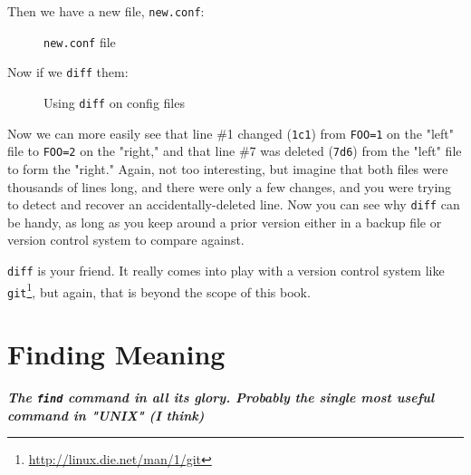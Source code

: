 \documentclass[10pt,american,]{book}
\makeatletter
\newenvironment{Shaded}{\begin{snugshade}}{\end{snugshade}}
\newcommand{\KeywordTok}[1]{\textcolor[rgb]{0.13,0.29,0.53}{\textbf{{#1}}}}
\newcommand{\OtherTok}[1]{\textcolor[rgb]{0.56,0.35,0.01}{{#1}}}
\newcommand{\NormalTok}[1]{{#1}}
\renewcommand{\href}[2]{#2\footnote{\url{#1}}}
\numberwithin{figure}{chapter}
\DeclareRobustCommand{\drcap}[1]{\begin{figure}[H]\caption{#1}\end{figure}}
\DeclareRobustCommand{\drcmd}[1]{\index{commands!#1@\texttt{#1}}}
\renewcommand{\KeywordTok}[1]{{#1}}
\renewcommand{\OtherTok}[1]{{#1}}
\renewcommand{\NormalTok}[1]{{#1}}
\makeatother
\begin{document}
Then we have a new file, \texttt{new.conf}:

\drcap{\texttt{new.conf} file}

\begin{Shaded}
\end{Shaded}

Now if we \texttt{diff} them:

\drcap{Using \texttt{diff} on config files}

\begin{Shaded}
\end{Shaded}

Now we can more easily see that line \#1 changed (\texttt{1c1}) from
\texttt{FOO=1} on the "left" file to \texttt{FOO=2} on the "right," and
that line \#7 was deleted (\texttt{7d6}) from the "left" file to form
the "right." Again, not too interesting, but imagine that both files
were thousands of lines long, and there were only a few changes, and you
were trying to detect and recover an accidentally-deleted line. Now you
can see why \texttt{diff} can be handy, as long as you keep around a
prior version either in a backup file or version control system to
compare against.

\texttt{diff} is your friend. It really comes into play with a version
control system like
\href{http://linux.die.net/man/1/git}{\texttt{git}}\drcmd{git}, but
again, that is beyond the scope of this book.

\hypertarget{finding-meaning}{\chapter{Finding
Meaning}\label{finding-meaning}}

\textbf{\emph{The \texttt{find} command in all its glory. Probably the
single most useful command in "UNIX" (I think)}}
\end{document}
